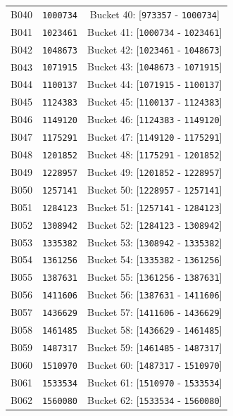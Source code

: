 \documentclass[11pt,a4paper]{article}
\begin{document}
{\begin{xltabular}{\textwidth}{l | C | C}
B040 & \texttt{1000734} & Bucket 40: [\texttt{973357} - \texttt{1000734}] \\
B041 & \texttt{1023461} & Bucket 41: [\texttt{1000734} - \texttt{1023461}] \\
B042 & \texttt{1048673} & Bucket 42: [\texttt{1023461} - \texttt{1048673}] \\
B043 & \texttt{1071915} & Bucket 43: [\texttt{1048673} - \texttt{1071915}] \\
B044 & \texttt{1100137} & Bucket 44: [\texttt{1071915} - \texttt{1100137}] \\
B045 & \texttt{1124383} & Bucket 45: [\texttt{1100137} - \texttt{1124383}] \\
B046 & \texttt{1149120} & Bucket 46: [\texttt{1124383} - \texttt{1149120}] \\
B047 & \texttt{1175291} & Bucket 47: [\texttt{1149120} - \texttt{1175291}] \\
B048 & \texttt{1201852} & Bucket 48: [\texttt{1175291} - \texttt{1201852}] \\
B049 & \texttt{1228957} & Bucket 49: [\texttt{1201852} - \texttt{1228957}] \\
B050 & \texttt{1257141} & Bucket 50: [\texttt{1228957} - \texttt{1257141}] \\
B051 & \texttt{1284123} & Bucket 51: [\texttt{1257141} - \texttt{1284123}] \\
B052 & \texttt{1308942} & Bucket 52: [\texttt{1284123} - \texttt{1308942}] \\
B053 & \texttt{1335382} & Bucket 53: [\texttt{1308942} - \texttt{1335382}] \\
B054 & \texttt{1361256} & Bucket 54: [\texttt{1335382} - \texttt{1361256}] \\
B055 & \texttt{1387631} & Bucket 55: [\texttt{1361256} - \texttt{1387631}] \\
B056 & \texttt{1411606} & Bucket 56: [\texttt{1387631} - \texttt{1411606}] \\
B057 & \texttt{1436629} & Bucket 57: [\texttt{1411606} - \texttt{1436629}] \\
B058 & \texttt{1461485} & Bucket 58: [\texttt{1436629} - \texttt{1461485}] \\
B059 & \texttt{1487317} & Bucket 59: [\texttt{1461485} - \texttt{1487317}] \\
B060 & \texttt{1510970} & Bucket 60: [\texttt{1487317} - \texttt{1510970}] \\
B061 & \texttt{1533534} & Bucket 61: [\texttt{1510970} - \texttt{1533534}] \\
B062 & \texttt{1560080} & Bucket 62: [\texttt{1533534} - \texttt{1560080}] \\

\end{xltabular}}
\end{document}
